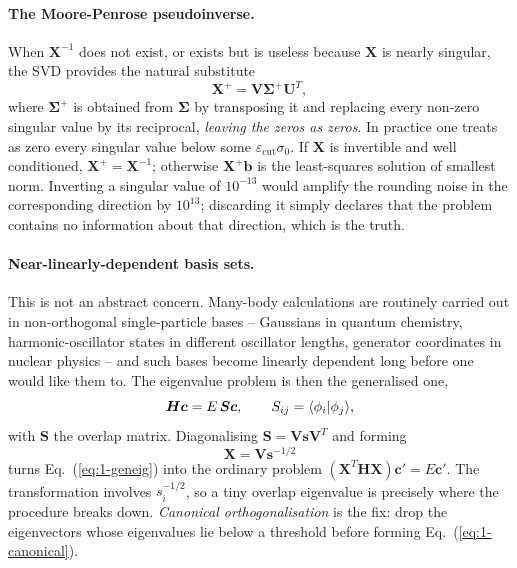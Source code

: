 \paragraph{The Moore-Penrose pseudoinverse.}
When $\bm{X}^{-1}$ does not exist, or exists but is useless because $\bm{X}$
is nearly singular, the SVD provides the natural substitute
\begin{equation}
  \bm{X}^{+} = \bm{V}\bm{\Sigma}^{+}\bm{U}^{T},
  \label{eq:1-pseudoinverse}
\end{equation}
where $\bm{\Sigma}^{+}$ is obtained from $\bm{\Sigma}$ by transposing it and
replacing every non-zero singular value by its reciprocal, \emph{leaving the
zeros as zeros}.  In practice one treats as zero every singular value below
some $\varepsilon_{\mathrm{cut}}\sigma_0$.  If $\bm{X}$ is invertible and well
conditioned, $\bm{X}^{+}=\bm{X}^{-1}$; otherwise $\bm{X}^{+}\bm{b}$ is the
least-squares solution of smallest norm.  Inverting a singular value of
$10^{-13}$ would amplify the rounding noise in the corresponding direction by
$10^{13}$; discarding it simply declares that the problem contains no
information about that direction, which is the truth.

\paragraph{Near-linearly-dependent basis sets.}
This is not an abstract concern.  Many-body calculations are routinely carried
out in non-orthogonal single-particle bases -- Gaussians in quantum chemistry,
harmonic-oscillator states in different oscillator lengths, generator
coordinates in nuclear physics -- and such bases become linearly dependent
long before one would like them to.  The eigenvalue problem is then the
generalised one,
\begin{equation}
  \bm{H}\bm{c} = E\,\bm{S}\bm{c},
  \qquad S_{ij}=\langle \phi_i \vert \phi_j \rangle,
  \label{eq:1-geneig}
\end{equation}
with $\bm{S}$ the overlap matrix.  Diagonalising $\bm{S}=\bm{V}\bm{s}\bm{V}^T$
and forming
\begin{equation}
  \bm{X} = \bm{V}\bm{s}^{-1/2}
  \label{eq:1-canonical}
\end{equation}
turns Eq.~(\ref{eq:1-geneig}) into the ordinary problem
$(\bm{X}^{T}\bm{H}\bm{X})\bm{c}'=E\bm{c}'$.  The transformation involves
$s_i^{-1/2}$, so a tiny overlap eigenvalue is precisely where the procedure
breaks down.  \emph{Canonical orthogonalisation} is the fix: drop the
eigenvectors whose eigenvalues lie below a threshold before forming
Eq.~(\ref{eq:1-canonical}).

